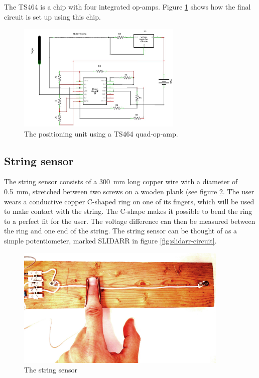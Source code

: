 \documentclass{article}
\begin{document}
The TS464 is a chip with four integrated op-amps. Figure \ref{fig:slidarr-circuit2} shows how the final circuit is set up using this chip.

\begin{figure}[ht]
  \centering
  \includegraphics[width=0.7\textwidth]{slidarr-circuit2}
  \caption{The positioning unit using a TS464 quad-op-amp.}
  \label{fig:slidarr-circuit2}
\end{figure}

\subsection{String sensor}
The string sensor consists of a \SI{300}{\milli\meter} long copper wire with a diameter of \SI{0.5}{\milli\meter}, stretched between two screws on a wooden plank (see figure \ref{fig:string_sensor}.  The user wears a conductive copper C-shaped ring on one of its fingers, which will be used to make contact with the string. The C-shape makes it possible to bend the ring to a perfect fit for the user. The voltage difference can then be measured between the ring and one end of the string. The string sensor can be thought of as a simple potentiometer, marked SLIDARR in figure \ref{fig:slidarr-circuit}.

\begin{figure}[ht]
  \centering
  \includegraphics[width=0.9\textwidth]{string-sensor}
  \caption{The string sensor}
  \label{fig:string_sensor}
\end{figure}
\end{document}

